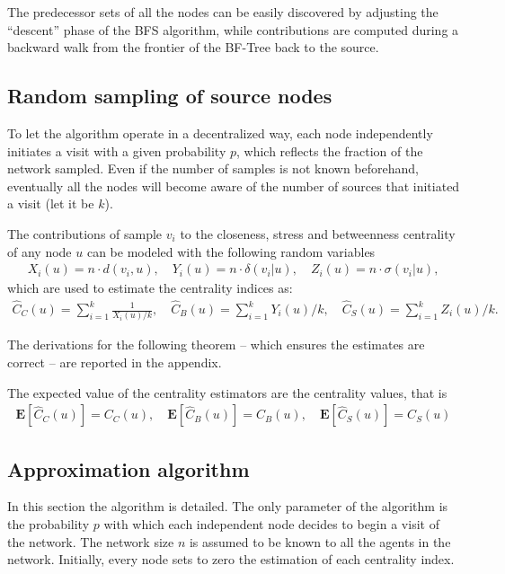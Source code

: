 The predecessor sets of all the nodes can be easily discovered by adjusting the ``descent'' phase of the BFS algorithm, while contributions are computed during a backward walk from the frontier of the BF-Tree back to the source.

\subsection{Random sampling of source nodes}

To let the algorithm operate in a decentralized way, each node independently initiates a visit with a given probability $p$, which reflects the fraction of the network sampled. Even if the number of samples is not known beforehand, eventually all the nodes will become aware of the number of sources that initiated a visit (let it be $k$).

The contributions of sample $v_i$ to the closeness, stress and betweenness centrality of any node $u$ can be modeled with the following random variables
\begin{eqnarray*}
X_i(u) = n \cdot d(v_i,u) , \quad
Y_i(u) = n \cdot \delta(v_i|u) , \quad
Z_i(u) = n \cdot \sigma(v_i|u) ,
\end{eqnarray*}
which are used to estimate the centrality indices as:
\begin{eqnarray*}
\widehat{C}_C(u) = \sum_{i=1}^k \frac{1}{X_i(u)/k} , \quad
\widehat{C}_B(u) = \sum_{i=1}^k Y_i(u)/k , \quad
\widehat{C}_S(u) = \sum_{i=1}^k Z_i(u)/k .
\end{eqnarray*}

The derivations for the following theorem -- which ensures the estimates are correct -- are reported in the appendix.

\begin{theorem}
The expected value of the centrality estimators are the centrality values, that is
\begin{eqnarray*}
\mathbf{E}[\widehat{C}_C(u)] = C_C(u), \quad
\mathbf{E}[\widehat{C}_B(u)] = C_B(u), \quad
\mathbf{E}[\widehat{C}_S(u)] = C_S(u) 
\end{eqnarray*}
\end{theorem}

\subsection{Approximation algorithm}

In this section the algorithm is detailed. The only parameter of the algorithm is the probability $p$ with which each independent node decides to begin a visit of the network. The network size $n$ is assumed to be known to all the agents in the network. Initially, every node sets to zero the estimation of each centrality index.

